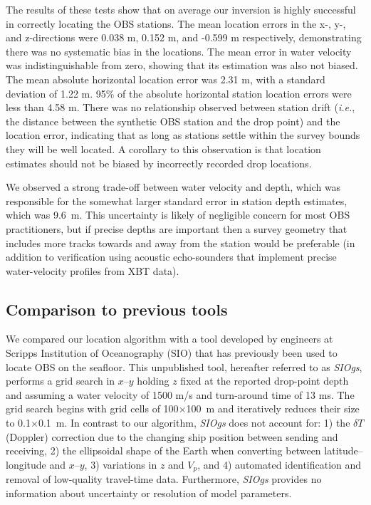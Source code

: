 The results of these tests show that on average our inversion is highly successful in correctly locating the OBS stations. The mean location errors in the x-, y-, and z-directions were 0.038 m, 0.152 m, and -0.599 m respectively, demonstrating there was no systematic bias in the locations. The mean error in water velocity was indistinguishable from zero, showing that its estimation was also not biased. The mean absolute horizontal location error was 2.31 m, with a standard deviation of 1.22 m. 95\% of the absolute horizontal station location errors were less than 4.58 m. There was no relationship observed between station drift (\textit{i.e.}, the distance between the synthetic OBS station and the drop point) and the location error, indicating that as long as stations settle within the survey bounds they will be well located. A corollary to this observation is that location estimates should not be biased by incorrectly recorded drop locations. 

We observed a strong trade-off between water velocity and depth, which was responsible for the somewhat larger standard error in station depth estimates, which was \mbox{9.6 m}. This uncertainty is likely of negligible concern for most OBS practitioners, but if precise depths are important then a survey geometry that includes more tracks towards and away from the station would be preferable (in addition to verification using acoustic echo-sounders that implement precise water-velocity profiles from XBT data).

\subsection{Comparison to previous tools}

We compared our location algorithm with a tool developed by engineers at Scripps Institution of Oceanography (SIO) that has previously been used to locate OBS on the seafloor. This unpublished tool, hereafter referred to as \textit{SIOgs}, performs a grid search in $x$--$y$ holding $z$ fixed at the reported drop-point depth and assuming a water velocity of 1500 m/s and turn-around time of 13 ms. The grid search begins with grid cells of 100$\times$100~m and iteratively reduces their size to 0.1$\times$0.1~m. In contrast to our algorithm, \textit{SIOgs} does not account for: 1) the $\delta T$ (Doppler) correction due to the changing ship position between sending and receiving, 2) the ellipsoidal shape of the Earth when converting between latitude--longitude and $x$--$y$, 3) variations in $z$ and $V_p$, and 4) automated identification and removal of low-quality travel-time data. Furthermore, \textit{SIOgs} provides no information about uncertainty or resolution of model parameters.  

